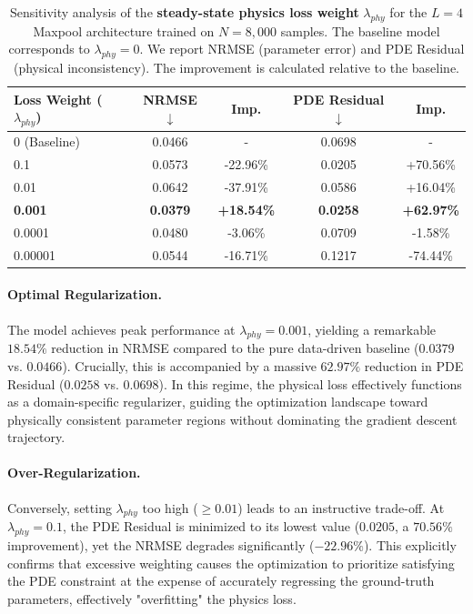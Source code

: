 \documentclass{article} %
\begin{document}
\begin{table}[h]
    \centering
    \caption{Sensitivity analysis of the \textbf{steady-state physics loss weight} $\lambda_{phy}$ for the $L=4$ Maxpool architecture trained on $N=8,000$ samples. The baseline model corresponds to $\lambda_{phy}=0$. We report NRMSE (parameter error) and PDE Residual (physical inconsistency). The improvement is calculated relative to the baseline.}
    \label{tab:lambda_sensitivity}
    \vspace{0.2cm}
    \begin{tabular}{lcccc}
        \toprule
        \textbf{Loss Weight ($\lambda_{phy}$)} & \textbf{NRMSE} $\downarrow$ & \textbf{Imp.} & \textbf{PDE Residual} $\downarrow$ & \textbf{Imp.} \\
        \midrule
        0 (Baseline) & 0.0466 & - & 0.0698 & - \\
        0.1 & 0.0573 & -22.96\% & 0.0205 & +70.56\% \\
        0.01 & 0.0642 & -37.91\% & 0.0586 & +16.04\% \\
        \textbf{0.001} & \textbf{0.0379} & \textbf{+18.54\%} & \textbf{0.0258} & \textbf{+62.97\%} \\
        0.0001 & 0.0480 & -3.06\% & 0.0709 & -1.58\% \\
        0.00001 & 0.0544 & -16.71\% & 0.1217 & -74.44\% \\
        \bottomrule
    \end{tabular}
\end{table}

\paragraph{Optimal Regularization.}
The model achieves peak performance at $\lambda_{phy} = 0.001$, yielding a remarkable $18.54\%$ reduction in NRMSE compared to the pure data-driven baseline ($0.0379$ vs. $0.0466$). Crucially, this is accompanied by a massive $62.97\%$ reduction in PDE Residual ($0.0258$ vs. $0.0698$). In this regime, the physical loss effectively functions as a domain-specific regularizer, guiding the optimization landscape toward physically consistent parameter regions without dominating the gradient descent trajectory.

\paragraph{Over-Regularization.}
Conversely, setting $\lambda_{phy}$ too high ($\ge 0.01$) leads to an instructive trade-off. At $\lambda_{phy}=0.1$, the PDE Residual is minimized to its lowest value ($0.0205$, a $70.56\%$ improvement), yet the NRMSE degrades significantly ($-22.96\%$). This explicitly confirms that excessive weighting causes the optimization to prioritize satisfying the PDE constraint at the expense of accurately regressing the ground-truth parameters, effectively "overfitting" the physics loss.
\end{document}

